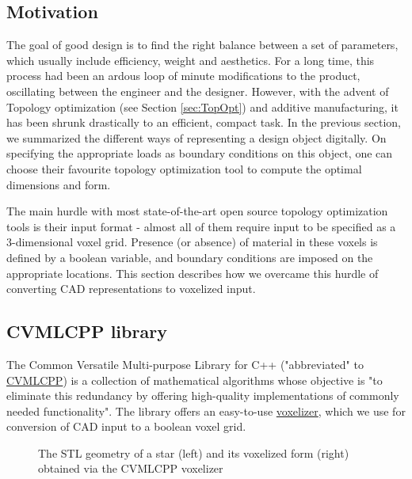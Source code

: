 \subsection{Motivation}
The goal of good design is to find the right balance between a set of parameters, which usually include efficiency, weight and aesthetics. For a long time, this process had been an ardous loop of minute modifications to the product, oscillating between the engineer and the designer. However, with the advent of Topology optimization (see Section \ref{sec:TopOpt}) and additive manufacturing, it has been shrunk drastically to an efficient, compact task. In the previous section, we summarized the different ways of representing a design object digitally. On specifying the appropriate loads as boundary conditions on this object, one can choose their favourite topology optimization tool to compute the optimal dimensions and form.


The main hurdle with most state-of-the-art open source topology optimization tools is their input format - almost all of them require input to be specified as a 3-dimensional voxel grid. Presence (or absence) of material in these voxels is defined by a boolean variable, and boundary conditions are imposed on the appropriate locations. This section describes how we overcame this hurdle of converting CAD representations to voxelized input.

\subsection{CVMLCPP library}
The Common Versatile Multi-purpose Library for C++ ("abbreviated" to \href{http://tech.unige.ch/cvmlcpp/}{CVMLCPP}) is a collection of mathematical algorithms whose objective is "to eliminate this redundancy by offering high-quality implementations of commonly needed functionality". The library offers an easy-to-use \href{http://tech.unige.ch/cvmlcpp/source/doc/Voxelizer.html}{voxelizer}, which we use for conversion of CAD input to a boolean voxel grid.

\begin{figure}
\centering
\begin{subfigure}{
  \texttt{[image: Pictures/STLToVoxels/Star\_STL.png]}}
\end{subfigure}
\begin{subfigure}{
  \texttt{[image: Pictures/STLToVoxels/Star\_VTK\_Trans.png]}}
\end{subfigure}
\caption{The STL geometry of a star (left) and its voxelized form (right) obtained via the CVMLCPP voxelizer}
\label{fig: voxelizerStar}
\end{figure}

